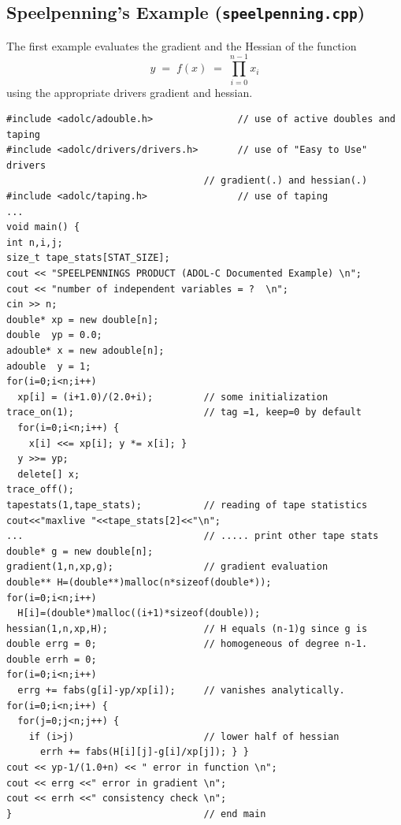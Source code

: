 \documentclass[11pt,twoside]{article}
\begin{document}
\subsection{Speelpenning's Example ({\tt speelpenning.cpp})}
%
The first example evaluates the gradient and the Hessian of
the function
\[ 
y \; = \; f(x)\; =\; \prod_{i=0}^{n-1} x_i 
\] 
using the appropriate drivers {\sf gradient} and {\sf hessian}.

\begin{verbatim}
#include <adolc/adouble.h>               // use of active doubles and taping
#include <adolc/drivers/drivers.h>       // use of "Easy to Use" drivers 
                                   // gradient(.) and hessian(.)
#include <adolc/taping.h>                // use of taping
...
void main() {
int n,i,j;
size_t tape_stats[STAT_SIZE];
cout << "SPEELPENNINGS PRODUCT (ADOL-C Documented Example) \n";
cout << "number of independent variables = ?  \n";
cin >> n;
double* xp = new double[n];          
double  yp = 0.0;
adouble* x = new adouble[n];      
adouble  y = 1;
for(i=0;i<n;i++)
  xp[i] = (i+1.0)/(2.0+i);         // some initialization
trace_on(1);                       // tag =1, keep=0 by default
  for(i=0;i<n;i++) {
    x[i] <<= xp[i]; y *= x[i]; }      
  y >>= yp;
  delete[] x;                      
trace_off();
tapestats(1,tape_stats);           // reading of tape statistics
cout<<"maxlive "<<tape_stats[2]<<"\n";
...                                // ..... print other tape stats
double* g = new double[n];        
gradient(1,n,xp,g);                // gradient evaluation
double** H=(double**)malloc(n*sizeof(double*));
for(i=0;i<n;i++)
  H[i]=(double*)malloc((i+1)*sizeof(double)); 
hessian(1,n,xp,H);                 // H equals (n-1)g since g is
double errg = 0;                   // homogeneous of degree n-1.
double errh = 0;
for(i=0;i<n;i++)
  errg += fabs(g[i]-yp/xp[i]);     // vanishes analytically.
for(i=0;i<n;i++) {
  for(j=0;j<n;j++) {
    if (i>j)                       // lower half of hessian
      errh += fabs(H[i][j]-g[i]/xp[j]); } }
cout << yp-1/(1.0+n) << " error in function \n";
cout << errg <<" error in gradient \n";
cout << errh <<" consistency check \n";
}                                  // end main
\end{verbatim}
%
\end{document}
